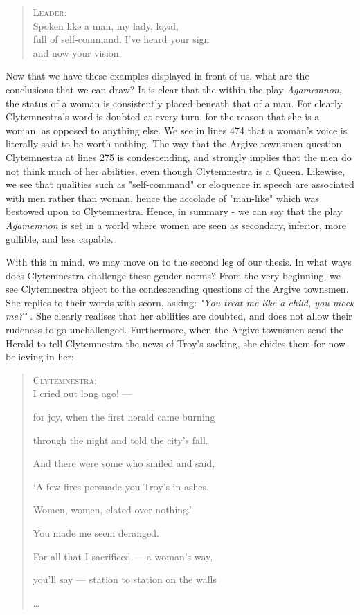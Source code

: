 \begin{quote}
  \textsc{Leader}: \\
  Spoken like a man, my lady, loyal, \\
  full of self-command. I've heard your sign \\
  and now your vision. \\

  \autocite[355]{Fagles}
\end{quote}

Now that we have these examples displayed in front of us, what are the
conclusions that we can draw? It is clear that the within the play
\emph{Agamemnon}, the status of a woman is consistently placed beneath that of a
man. For clearly, Clytemnestra's word is doubted at every turn, for the reason
that she is a woman, as opposed to anything else. We see in lines 474 that a
woman's voice is literally said to be worth nothing. The way that the Argive
townsmen question Clytemnestra at lines 275 is condescending, and strongly
implies that the men do not think much of her abilities, even though
Clytemnestra is a Queen. Likewise, we see that qualities such as "self-command"
or eloquence in speech are associated with men rather than woman, hence the
accolade of "man-like" which was bestowed upon to Clytemnestra. Hence, in
summary - we can say that the play \emph{Agamemnon} is set in a world where
women are seen as secondary, inferior, more gullible, and less capable.

With this in mind, we may move on to the second leg of our thesis. In what ways
does Clytemnestra challenge these gender norms? From the very beginning, we see
Clytemnestra object to the condescending questions of the Argive townsmen. She
replies to their words with scorn, asking: \emph{"You treat me like a child,
you mock me?"} \autocite[275]{Fagles}. She clearly realises that her abilities
are doubted, and does not allow their rudeness to go unchallenged. Furthermore,
when the Argive townsmen send the Herald to tell Clytemnestra the news of Troy's
sacking, she chides them for now believing in her:

\begin{quote}
  \textsc{Clytemnestra}: \\
  I cried out long ago! ---

  for joy, when the first herald came burning

  through the night and told the city's fall.

  And there were some who smiled and said,

  `A few fires persuade you Troy's in ashes.

  Women, women, elated over nothing.'

  You made me seem deranged.

  For all that I sacrificed --- a woman's way,

  you'll say --- station to station on the walls

  \ldots\

  \autocite[580]{Fagles}
\end{quote}


